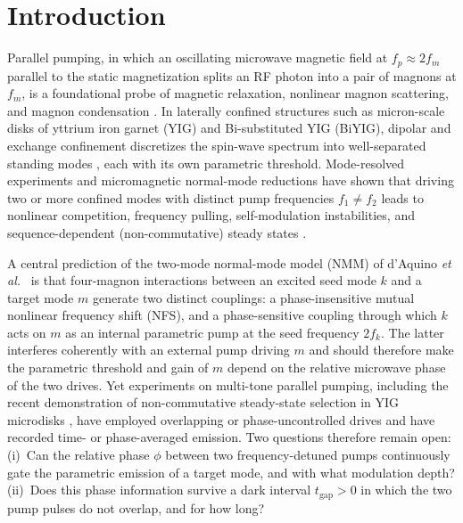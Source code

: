 \documentclass[aps,prb,reprint,superscriptaddress,floatfix]{revtex4-2}
\newcommand{\tgap}{t_{\mathrm{gap}}}
\begin{document}
\maketitle

\section{Introduction}\label{sec:intro}

Parallel pumping, in which an oscillating microwave magnetic field at $f_p\approx 2f_m$ parallel to the static magnetization splits an RF photon into a pair of magnons at $f_m$, is a foundational probe of magnetic relaxation, nonlinear magnon scattering, and magnon condensation \cite{suhl57,gurevich96,bracher17}. In laterally confined structures such as micron-scale disks of yttrium iron garnet (YIG) and Bi-substituted YIG (BiYIG), dipolar and exchange confinement discretizes the spin-wave spectrum into well-separated standing modes \cite{daquino09,srivastava23,abert19}, each with its own parametric threshold. Mode-resolved experiments and micromagnetic normal-mode reductions \cite{srivastava23,massouras24,perna22} have shown that driving two or more confined modes with distinct pump frequencies $f_1\neq f_2$ leads to nonlinear competition, frequency pulling, self-modulation instabilities, and sequence-dependent (non-commutative) steady states \cite{daquino26,soares26,yemeli25,kim24}.

A central prediction of the two-mode normal-mode model (NMM) of d'Aquino \textit{et al.}\ \cite{daquino26} is that four-magnon interactions between an excited seed mode $k$ and a target mode $m$ generate two distinct couplings: a phase-insensitive mutual nonlinear frequency shift (NFS), and a phase-sensitive coupling through which $k$ acts on $m$ as an internal parametric pump at the seed frequency $2f_k$. The latter interferes coherently with an external pump driving $m$ and should therefore make the parametric threshold and gain of $m$ depend on the relative microwave phase of the two drives. Yet experiments on multi-tone parallel pumping, including the recent demonstration of non-commutative steady-state selection in YIG microdisks \cite{soares26}, have employed overlapping or phase-uncontrolled drives and have recorded time- or phase-averaged emission. Two questions therefore remain open: (i)~Can the relative phase $\phi$ between two frequency-detuned pumps continuously gate the parametric emission of a target mode, and with what modulation depth? (ii)~Does this phase information survive a dark interval $\tgap>0$ in which the two pump pulses do not overlap, and for how long?
\end{document}

